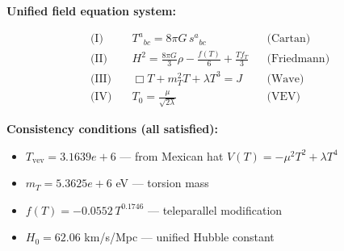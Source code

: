 
\textbf{Unified field equation system:}

\begin{align}
  \text{(I)} \quad & T^a{}_{bc} = 8\pi G \, s^a{}_{bc} && \text{(Cartan)} \\
  \text{(II)} \quad & H^2 = \frac{8\pi G}{3}\rho - \frac{f(T)}{6} + \frac{Tf_T}{3} && \text{(Friedmann)} \\
  \text{(III)} \quad & \Box T + m_T^2 T + \lambda T^3 = J && \text{(Wave)} \\
  \text{(IV)} \quad & T_0 = \frac{\mu}{\sqrt{2\lambda}} && \text{(VEV)}
\end{align}

\textbf{Consistency conditions (all satisfied):}
\begin{itemize}
  \item $T_{\text{vev}} = 3.1639e+6$ — from Mexican hat $V(T) = -\mu^2 T^2 + \lambda T^4$
  \item $m_T = 5.3625e+6$ eV — torsion mass
  \item $f(T) = -0.0552 \, T^{0.1746}$ — teleparallel modification
  \item $H_0 = 62.06$ km/s/Mpc — unified Hubble constant
\end{itemize}